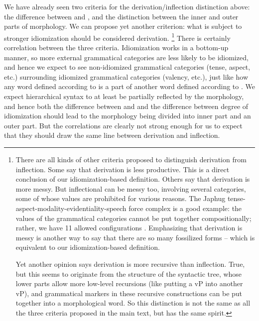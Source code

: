 \documentclass[a4paper, oneside, scheme=plain, 12pt]{article}
\newcommand*{\citepage}[1]{p.~{#1}}
\begin{document}
We have already seen two criteria for the derivation/inflection distinction above:
the difference between  and ,
and the distinction between the inner and outer parts of morphology.
We can propose yet another criterion:
what is subject to stronger idiomization should be considered derivation.%
\footnote{
    There are all kinds of other criteria proposed to distinguish derivation from inflection.
    Some say that derivation is less productive.
    This is a direct conclusion of our idiomization-based definition.
    Others say that derivation is more messy.
    But inflectional can be messy too,
    involving several categories, some of whose values are prohibited for various reasons.
    The Japhug tense-aspect-modality-evidentiality-speech force complex is a good example:
    the values of the grammatical categories cannot be put together compositionally;
    rather, we have 11 allowed configurations \citep[\citepage{1082}]{jacques2021grammar}.
    Emphasizing that derivation is messy is another way to say that there are so many fossilized forms --
    which is equivalent to our idiomization-based definition.
    
    Yet another opinion says derivation is more recursive than inflection.
    True, but this seems to originate from the structure of the syntactic tree,
    whose lower parts allow more low-level recursions (like putting a vP into another vP),
    and grammatical markers in these recursive constructions can be put together into a morphological word.
    So this distinction is not the same as all the three criteria proposed in the main text,
    but has the same spirit.
}
There is certainly correlation between the three criteria.
Idiomization works in a bottom-up manner,
so more external grammatical categories are less likely to be idiomized,
and hence we expect to see non-idiomized grammatical categories (tense, aspect, etc.)
surrounding idiomized grammatical categories (valency, etc.),
just like how any word defined according to 
is a part of another word defined according to .
We expect hierarchical syntax to at least be partially reflected by the morphology,
and hence both the difference between  and 
and the difference between degree of idiomization
should lead to the morphology being divided into inner part and an outer part.
But the correlations are clearly not strong enough for us to expect that they should draw the same line between derivation and inflection.
\end{document}
